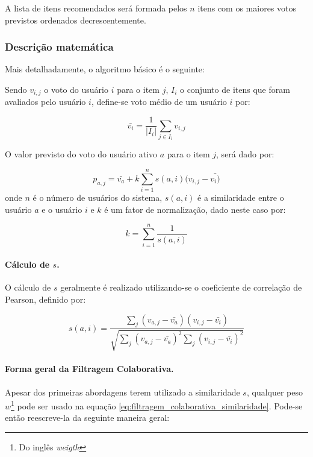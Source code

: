 A lista de itens recomendados será formada pelos $n$ itens com os maiores votos previstos ordenados decrescentemente.

\subsubsection{Descrição matemática}
Mais detalhadamente, o algoritmo básico é o seguinte:

Sendo $v_{i,j}$ o voto do usuário $i$ para o item $j$, $I_{i}$ o conjunto de itens que foram avaliados pelo usuário $i$, define-se voto médio de um usuário $i$ por:

\begin{equation}
 \bar{v_{i}} = \frac{1}{|I_{i}|} \sum_{j \in I_{i}} v_{i,j}
\end{equation}

O valor previsto do voto do usuário ativo $a$ para o item $j$, será dado por:

\begin{equation}
 p_{a,j} = \bar{v_{a}} + k\sum_{i=1}^n{s(a,i) (v_{i,j} - \bar{v_{i})}}
 \label{eq:filtragem_colaborativa_similaridade} 
\end{equation}
onde $n$ é o número de usuários do sistema, $s(a,i)$ é a similaridade entre o usuário $a$ e o usuário $i$ e $k$ é um fator de normalização, dado neste caso por:

\begin{equation}
 k = \sum_{i=1}^n{\frac{1}{s(a,i)}}
\end{equation}


\paragraph{Cálculo de $s$.}

O cálculo de $s$ geralmente é realizado utilizando-se o coeficiente de correlação de Pearson\cite{Breese98}, definido por:

\begin{equation}
\label{eq:calculo_s}
 s(a,i) = \frac{\sum_{j}{(v_{a,j} - \bar{v_{a}}) (v_{i,j} - \bar{v_{i}})}}{\sqrt{\sum_{j}{(v_{a,j} - \bar{v_{a}})}^2\sum_{j}{(v_{i,j} - \bar{v_{i}})}^2}}
\end{equation}

\paragraph{Forma geral da Filtragem Colaborativa.}

Apesar dos primeiras abordagens terem utilizado a similaridade $s$, qualquer peso $w$\footnote{Do inglês \textit{weigth}} pode ser usado na equação \ref{eq:filtragem_colaborativa_similaridade}. Pode-se então reescreve-la da seguinte maneira geral:

